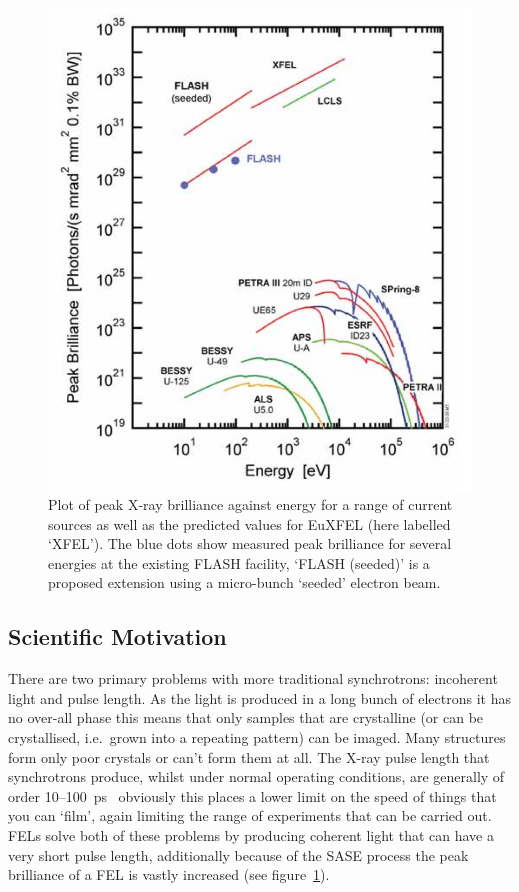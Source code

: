 \begin{figure}[h]
  \centering
    \includegraphics[width=.9\textwidth]{images/Other/XFEL-comparitive_energy-brightness.png}
  \caption{Plot of peak X-ray brilliance against energy for a range of current sources as well as the predicted values for EuXFEL (here labelled `XFEL'). The blue dots show measured peak brilliance for several energies at the existing FLASH facility, `FLASH (seeded)' is a proposed extension using a micro-bunch `seeded' electron beam.}
  \label{fig:xfel-brightness}
\end{figure}

\subsection{Scientific Motivation} %
\label{sub:scientific_motivation}
There are two primary problems with more traditional synchrotrons: incoherent light and pulse length. As the light is produced in a long bunch of electrons it has no over-all phase this means that only samples that are crystalline (or can be crystallised, i.e.\ grown into a repeating pattern) can be imaged. Many structures form only poor crystals or can't form them at all. The X-ray pulse length that synchrotrons produce, whilst under normal operating conditions, are generally of order 10--100~ps~\cite{SYNCH REVIEW REF} obviously this places a lower limit on the speed of things that you can `film', again limiting the range of experiments that can be carried out. FELs solve both of these problems by producing coherent light that can have a very short pulse length, additionally because of the SASE process the peak brilliance of a FEL is vastly increased (see figure~\ref{fig:xfel-brightness}).

